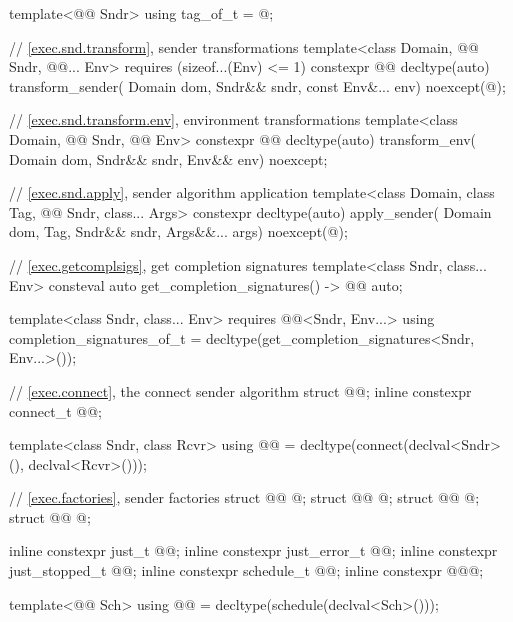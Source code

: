 \begin{codeblock}
{  template<@@ Sndr>
    using tag_of_t = @\seebelow@;

  // \ref{exec.snd.transform}, sender transformations
  template<class Domain, @@ Sndr, @@... Env>
      requires (sizeof...(Env) <= 1)
    constexpr @@ decltype(auto) transform_sender(
      Domain dom, Sndr&& sndr, const Env&... env) noexcept(@\seebelow@);

  // \ref{exec.snd.transform.env}, environment transformations
  template<class Domain, @@ Sndr, @@ Env>
    constexpr @@ decltype(auto) transform_env(
      Domain dom, Sndr&& sndr, Env&& env) noexcept;

  // \ref{exec.snd.apply}, sender algorithm application
  template<class Domain, class Tag, @@ Sndr, class... Args>
    constexpr decltype(auto) apply_sender(
      Domain dom, Tag, Sndr&& sndr, Args&&... args) noexcept(@\seebelow@);

  // \ref{exec.getcomplsigs}, get completion signatures
  template<class Sndr, class... Env>
    consteval auto get_completion_signatures() -> @@ auto;

  template<class Sndr, class... Env>
      requires @@<Sndr, Env...>
    using completion_signatures_of_t = decltype(get_completion_signatures<Sndr, Env...>());

  // \ref{exec.connect}, the connect sender algorithm
  struct @@;
  inline constexpr connect_t @@{};

  template<class Sndr, class Rcvr>
    using @@ =
      decltype(connect(declval<Sndr>(), declval<Rcvr>()));

  // \ref{exec.factories}, sender factories
  struct @@ { @\unspec@ };
  struct @@ { @\unspec@ };
  struct @@ { @\unspec@ };
  struct @@ { @\unspec@ };

  inline constexpr just_t @@{};
  inline constexpr just_error_t @@{};
  inline constexpr just_stopped_t @@{};
  inline constexpr schedule_t @@{};
  inline constexpr @\unspec@ @@{};

  template<@@ Sch>
    using @@ = decltype(schedule(declval<Sch>()));

}
\end{codeblock}
